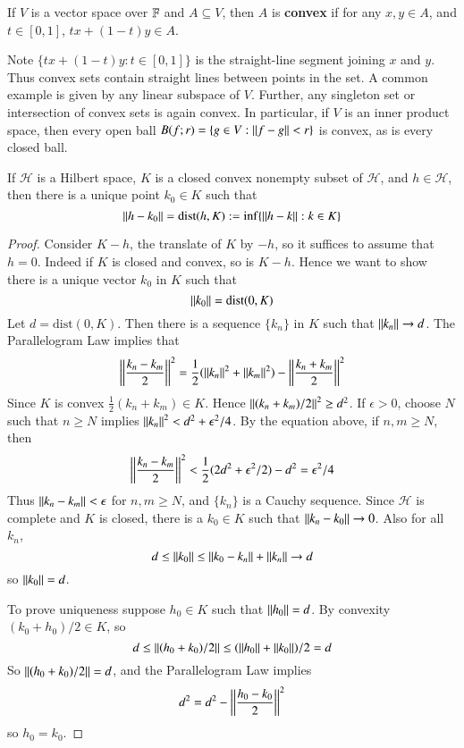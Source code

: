 \begin{defn}
    If $V$ is a vector space over $\mathbb F$ and $A \subseteq V$, then $A$ is \textbf{convex} if for any $x,y \in A$, and $t \in [0,1]$, $tx+(1-t)y \in A$.
\end{defn}

Note $\{tx+(1-t)y: t \in [0,1]\}$ is the straight-line segment joining $x$ and $y$. Thus convex sets contain straight lines between points in the set. A common example is given by any linear subspace of $V$. Further, any singleton set or intersection of convex sets is again convex. In particular, if $V$ is an inner product space, then every open ball $B(f;r) = \{g \in V:\left|\left| f-g\right|\right| < r\}$ is convex, as is every closed ball.

\begin{thm}
    If $\mathscr{H}$ is a Hilbert space, $K$ is a closed convex nonempty subset of $\mathscr{H}$, and $h \in \mathscr{H}$, then there is a unique point $k_0 \in K$ such that $$\left|\left| h-k_0\right|\right| = \text{dist}(h,K) := \inf\{\left|\left| h-k\right|\right|:k \in K\}$$
\end{thm}
\begin{proof}
    Consider $K - h$, the translate of $K$ by $-h$, so it suffices to assume that $h = 0$. Indeed if $K$ is closed and convex, so is $K-h$. Hence we want to show there is a unique vector $k_0$ in $K$ such that $$\left|\left| k_0\right|\right| = \text{dist}(0,K)$$
    Let $d = \text{dist}(0,K)$. Then there is a sequence $\{k_n\}$ in $K$ such that $\left|\left| k_n\right|\right|\rightarrow d$. The Parallelogram Law implies that $$\left|\left| \frac{k_n-k_m}{2}\right|\right|^2 = \frac{1}{2}(\left|\left| k_n\right|\right|^2+\left|\left| k_m\right|\right|^2)-\left|\left| \frac{k_n+k_m}{2}\right|\right|^2$$
    Since $K$ is convex $\frac{1}{2}(k_n+k_m) \in K$. Hence $\left|\left| (k_n+k_m)/2\right|\right|^2 \geq d^2$. If $\epsilon > 0$, choose $N$ such that $n \geq N$ implies $\left|\left| k_n\right|\right|^2 < d^2 +\epsilon^2/4$. By the equation above, if $n,m \geq N$, then $$\left|\left| \frac{k_n-k_m}{2}\right|\right|^2 < \frac{1}{2}(2d^2+\epsilon^2/2)-d^2 = \epsilon^2/4$$
    Thus $\left|\left| k_n-k_m\right|\right|< \epsilon$ for $n,m \geq N$, and $\{k_n\}$ is a Cauchy sequence. Since $\mathscr{H}$ is complete and $K$ is closed, there is a $k_0 \in K$ such that $\left|\left| k_n-k_0\right|\right|\rightarrow 0$. Also for all $k_n$, $$d \leq \left|\left| k_0\right|\right| \leq \left|\left| k_0-k_n\right|\right|+\left|\left| k_n\right|\right|\rightarrow d$$
    so $\left|\left| k_0\right|\right| = d$.

    To prove uniqueness suppose $h_0 \in K$ such that $\left|\left| h_0\right|\right| = d$. By convexity $(k_0+h_0)/2 \in K$, so $$d \leq \left|\left| (h_0+k_0)/2\right|\right| \leq (\left|\left| h_0\right|\right|+\left|\left| k_0\right|\right|)/2 = d$$
    So $\left|\left| (h_0+k_0)/2\right|\right| = d$, and the Parallelogram Law implies $$d^2 = d^2 - \left|\left| \frac{h_0-k_0}{2}\right|\right|^2$$
    so $h_0 = k_0$.
\end{proof}

